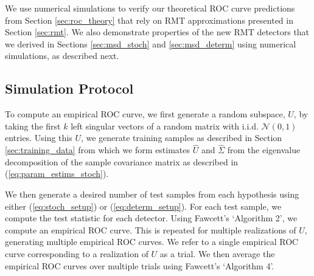 We use numerical simulations to verify our theoretical ROC curve predictions from Section \ref{sec:roc_theory} that rely on RMT approximations presented in Section \ref{sec:rmt}. We also demonstrate properties of the new RMT detectors that we derived in Sections \ref{sec:msd_stoch} and \ref{sec:msd_determ} using numerical simulations, as described next.


\subsection{Simulation Protocol}\label{sec:sim_proto}

To compute an empirical ROC curve, we first generate a random subspace, $U$, by taking the first $k$ left singular vectors of a random matrix with i.i.d. $\mathcal{N}(0,1)$ entries. Using this $U$, we generate training samples as described in Section \ref{sec:training_data} from which we form estimates $\widehat{U}$ and $\widehat{\Sigma}$ from the eigenvalue decomposition of the sample covariance matrix as described in (\ref{eq:param_estims_stoch}).

We then generate a desired number of test samples from each hypothesis using either (\ref{eq:stoch_setup}) or (\ref{eq:determ_setup}). For each test sample, we compute the test statistic for each detector. Using Fawcett's \cite{fawcett2006introduction} `Algorithm 2', we compute an empirical ROC curve. This is repeated for multiple realizations of $U$, generating multiple empirical ROC curves. We refer to a single empirical ROC curve corresponding to a realization of $U$ as a trial. We then average the empirical ROC curves over multiple trials using Fawcett's \cite{fawcett2006introduction} `Algorithm 4'.


